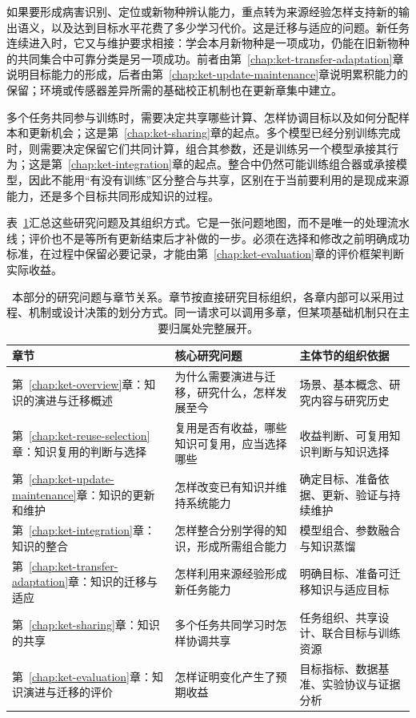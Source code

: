 如果要形成病害识别、定位或新物种辨认能力，重点转为来源经验怎样支持新的输出语义，以及达到目标水平花费了多少学习代价。这是迁移与适应的问题。新任务连续进入时，它又与维护要求相接：学会本月新物种是一项成功，仍能在旧新物种的共同集合中可靠分类是另一项成功。前者由第~\ref{chap:ket-transfer-adaptation}章说明目标能力的形成，后者由第~\ref{chap:ket-update-maintenance}章说明累积能力的保留；环境或传感器差异所需的基础校正机制也在更新章集中建立。

多个任务共同参与训练时，需要决定共享哪些计算、怎样协调目标以及如何分配样本和更新机会；这是第~\ref{chap:ket-sharing}章的起点。多个模型已经分别训练完成时，则需要决定保留它们共同计算，组合其参数，还是训练另一个模型承接其行为；这是第~\ref{chap:ket-integration}章的起点。整合中仍然可能训练组合器或承接模型，因此不能用“有没有训练”区分整合与共享，区别在于当前要利用的是现成来源能力，还是多个目标共同形成知识的过程。

表~\ref{tab:ket-overview-chapters}汇总这些研究问题及其组织方式。它是一张问题地图，而不是唯一的处理流水线；评价也不是等所有更新结束后才补做的一步。必须在选择和修改之前明确成功标准，在过程中保留必要记录，才能由第~\ref{chap:ket-evaluation}章的评价框架判断实际收益。

\begin{table}[htbp]
  \centering
  \small
  \begin{tabularx}{\linewidth}{@{}p{47mm}XX@{}}
    \toprule
    章节 & 核心研究问题 & 主体节的组织依据 \\
    \midrule
    第~\ref{chap:ket-overview}章：知识的演进与迁移概述 & 为什么需要演进与迁移，研究什么，怎样发展至今 & 场景、基本概念、研究内容与研究历史 \\
    第~\ref{chap:ket-reuse-selection}章：知识复用的判断与选择 & 复用是否有收益，哪些知识可复用，应当选择哪些 & 收益判断、可复用知识判断与知识选择 \\
    第~\ref{chap:ket-update-maintenance}章：知识的更新和维护 & 怎样改变已有知识并维持系统能力 & 确定目标、准备依据、更新、验证与持续维护 \\
    第~\ref{chap:ket-integration}章：知识的整合 & 怎样整合分别学得的知识，形成所需组合能力 & 模型组合、参数融合与知识蒸馏 \\
    第~\ref{chap:ket-transfer-adaptation}章：知识的迁移与适应 & 怎样利用来源经验形成新任务能力 & 明确目标、准备可迁移知识与适应目标 \\
    第~\ref{chap:ket-sharing}章：知识的共享 & 多个任务共同学习时怎样协调共享 & 任务组织、共享设计、联合目标与训练资源 \\
    第~\ref{chap:ket-evaluation}章：知识演进与迁移的评价 & 怎样证明变化产生了预期收益 & 目标指标、数据基准、实验协议与证据分析 \\
    \bottomrule
  \end{tabularx}
  \caption{本部分的研究问题与章节关系。章节按直接研究目标组织，各章内部可以采用过程、机制或设计决策的划分方式。同一请求可以调用多章，但某项基础机制只在主要归属处完整展开。}
  \label{tab:ket-overview-chapters}
\end{table}

